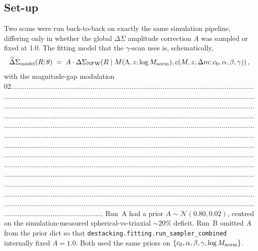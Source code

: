 \documentclass[11pt,a4paper]{article}
\newcommand{\DS}{\Delta\Sigma}
\begin{document}
\subsection{Set-up}

Two scans were run back-to-back on exactly the same simulation
pipeline, differing only in whether the global $\DS$ amplitude
correction $A$ was sampled or fixed at 1.0. The fitting model that the
$\gamma$-scan uses is, schematically,
\begin{equation}
\widehat\DS_{\rm model}(R; \theta)
\;=\;
A \cdot \DS_{\rm NFW}\!\left(R \mid M(\Lambda, z; \log M_{\rm norm}),
       c(M, z, \Delta m; c_{0}, \alpha, \beta, \gamma)\right),
\label{eq:model}
\end{equation}
with the magnitude-gap modulation
02............................................................................................................................................................................................................................................................................................................................................................................................................................................................................................................................................................................................................................................................................................................................................................................................................................................................................................................................................................................................................................................................................................................................................................................................................................................................................................................................................................................................................................................................................................................................................................................................................................................................................................................................................................................................
Run~A had a prior
$A \sim \mathcal{N}(0.80, 0.02)$, centred on the simulation-measured
spherical-vs-triaxial $\sim$20\% deficit. Run~B omitted $A$ from the
prior dict so that \verb|destacking.fitting.run_sampler_combined|
internally fixed $A = 1.0$. Both used the same priors on
$\{c_{0}, \alpha, \beta, \gamma, \log M_{\rm norm}\}$.
\end{document}
